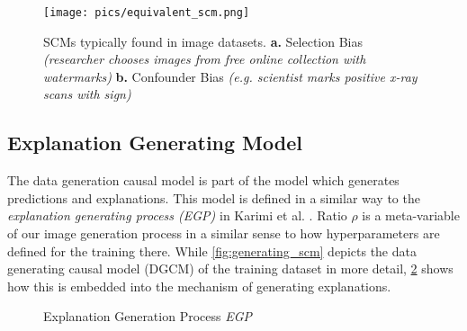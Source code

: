 \begin{figure}[t!]
    \centering
    \texttt{[image: pics/equivalent\_scm.png]}
    \caption[Selection vs. Confounder Bias]{SCMs typically found in image datasets.
    \textbf{a.} Selection Bias \textit{(researcher chooses images from free online collection with watermarks)}
    \textbf{b.} Confounder Bias \textit{(e.g. scientist marks positive x-ray scans with sign)}}
    \label{fig:equivalent_scm}
\end{figure}

\subsection{Explanation Generating Model}
The data generation causal model is part of the model which generates predictions and explanations.
This model is defined in a similar way to the \textit{explanation generating process (EGP)} in Karimi et al. \cite{Karimi2023}.
Ratio $\rho$ is a meta-variable of our image generation process in a similar sense to how hyperparameters are defined for the training there. While \cref{fig:generating_scm} depicts the data generating causal model (DGCM) of the training dataset in more detail, \cref{fig:egp} shows how this is embedded into the mechanism of generating explanations. 

\begin{figure}[t!]
    \centering
    \caption[Explanation Generation Process (EGP)]{Explanation Generation Process \textit{EGP}}
    \label{fig:egp}
\end{figure}

